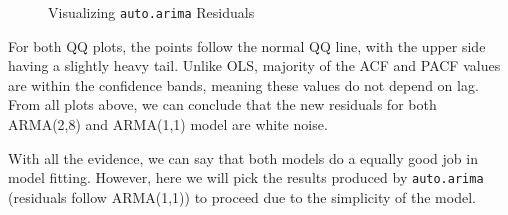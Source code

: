 \documentclass{article}\usepackage[]{graphicx}\usepackage[]{color}
\newenvironment{knitrout}{}{} %
\begin{document}
\begin{knitrout}
\color{fgcolor}\begin{figure}[H]

{\centering {}

}

\caption{Visualizing \texttt{auto.arima} Residuals}\label{fig:ts_6}
\end{figure}


\end{knitrout}

For both QQ plots, the points follow the normal QQ line, with the upper side having a slightly heavy tail. Unlike OLS, majority of the ACF and PACF values are within the confidence bands, meaning these values do not depend on lag. From all plots above, we can conclude that the new residuals for both ARMA(2,8) and ARMA(1,1) model are white noise. 

With all the evidence, we can say that both models do a equally good job in model fitting. However, here we will pick the results produced by \texttt{auto.arima} (residuals follow ARMA(1,1)) to proceed due to the simplicity of the model.
\end{document}
